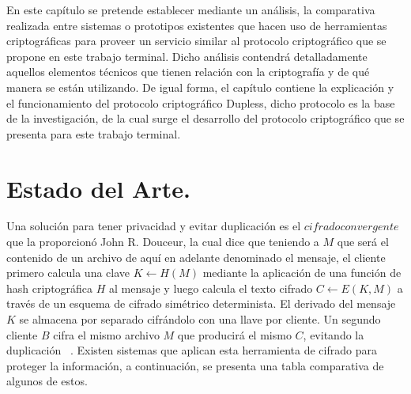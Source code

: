 
En este capítulo se pretende establecer mediante un análisis, la comparativa realizada entre sistemas o prototipos existentes que hacen uso de herramientas criptográficas para proveer un servicio similar al protocolo criptográfico que se propone en este trabajo terminal. Dicho análisis contendrá detalladamente aquellos elementos técnicos que tienen relación con la criptografía y de qué manera se están utilizando. De igual forma, el capítulo contiene la explicación y el funcionamiento del protocolo criptográfico Dupless, dicho protocolo es la base de la investigación, de la cual surge el desarrollo del protocolo criptográfico que se presenta para este trabajo terminal. 






\section{Estado del Arte. }

Una solución para tener privacidad y evitar duplicación es el $cifrado convergente$ que la proporcionó John R. Douceur, la cual dice que teniendo a $M$ que será el contenido de un archivo de aquí en adelante denominado el mensaje, el cliente primero calcula una clave $K ← H(M)$ mediante la aplicación de una función de hash criptográfica $H$ al mensaje y luego calcula el texto cifrado $C ← E(K, M)$ a través de un esquema de cifrado simétrico determinista. El derivado del mensaje $K$ se almacena por separado cifrándolo con una llave por cliente. Un segundo cliente $B$ cifra el mismo archivo $M$ que producirá el mismo $C$, evitando la duplicación ~\cite{donceur}. Existen sistemas que aplican esta herramienta de cifrado para proteger la información, a continuación, se presenta una tabla comparativa de algunos de estos. \\




